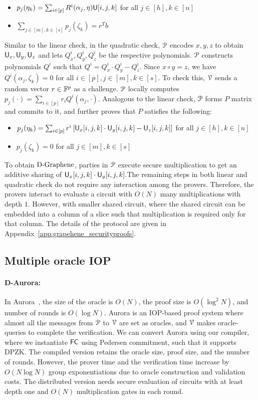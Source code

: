 {\begin{itemize}
	\item $p_j(\eta_k) = \sum_{i\in[p]} R^i(\alpha_j, \eta) \mathsf{U}[i,j,k]$ for all $j \in [h], k \in [n]$
	\item $\sum_{j\in [m], k\in [s]} p_j (\zeta_k) = r^Tb$
\end{itemize}
%
Similar to the linear check, in the quadratic check, $\mathcal{P}$ encodes $x,y,z$ to obtain $\mathsf{U}_x, \mathsf{U}_y, \mathsf{U}_z$ and lets $Q^i_x, Q^i_y, Q^i_z$  be the respective polynomials. $\mathcal{P}$ constructs polynomials $Q^i$ such that $Q^i = Q^i_x\cdot Q^i_y - Q^i_z$. Since $x\circ y = z$, we have $Q^i(\alpha_j,\zeta_k) = 0$ for all $i\in[p], j\in[m], k\in[s]$. To check this, $\mathcal{V}$ sends a random vector $r\in \mathbb{F}^p$ as a challenge. $\mathcal{P}$ locally computes $p_j(\cdot) = \sum_{i \in [p]} r_i Q^i(\alpha_j, \cdot)$. Analogous to the linear check, $\mathcal{P}$ forms $P$ matrix and commits to it, and further proves that $P$ satisfies the following:
\begin{itemize}
	\item $p_j(\eta_k) = \sum_{i\in[p]} r^i \left[\mathsf{U}_x[i,j,k] \cdot \mathsf{U}_y[i,j,k] - \mathsf{U}_z[i,j,k]\right]$ for all $j \in [h], k \in [n]$
	\item $p_j (\zeta_k) = 0$ for all $j \in [m], k \in [s]$
\end{itemize}
%
To obtain $\text{D-Graphene}$, parties in $\mathcal{P}$ execute secure multiplication to get an additive sharing of $\mathsf{U}_x[i,j,k] \cdot \mathsf{U}_y[i,j,k]$.The remaining steps in both linear and quadratic check do not require any interaction among the provers. Therefore, the provers interact to evaluate a circuit with $O(N)$ many multiplications with depth $1$. However, with smaller shared circuit, where the shared circuit can be embedded into a
column of a slice such that multiplication is required only for that column.
The details of the protocol are given in Appendix~\ref{app:grapehene_securityproofs}.}


\subsection{Multiple oracle IOP}
\paragraph*{D-Aurora:}
In Aurora~\cite{aurora}, the size of the oracle is $O(N)$, the proof size is $O(\log^2 N)$, and number of rounds is $O(\log N)$. Aurora is an IOP-based proof system where almost all the messages from $\mathcal{P}$ to $\mathcal{V}$ are set as oracles, and $\mathcal{V}$ makes oracle-queries to complete the verification.
We can convert Aurora using our compiler, where we instantiate $\mathsf{FC}$ using Pedersen commitment, such that it supports DPZK. The compiled version retains the oracle size, proof size, and the number of rounds. However, the prover time and the verification time increase by $O(N\log N)$ group exponentiations due to oracle construction and validation costs. The distributed version needs secure evaluation of circuits with at least depth one and $O(N)$ multiplication gates in each round.
